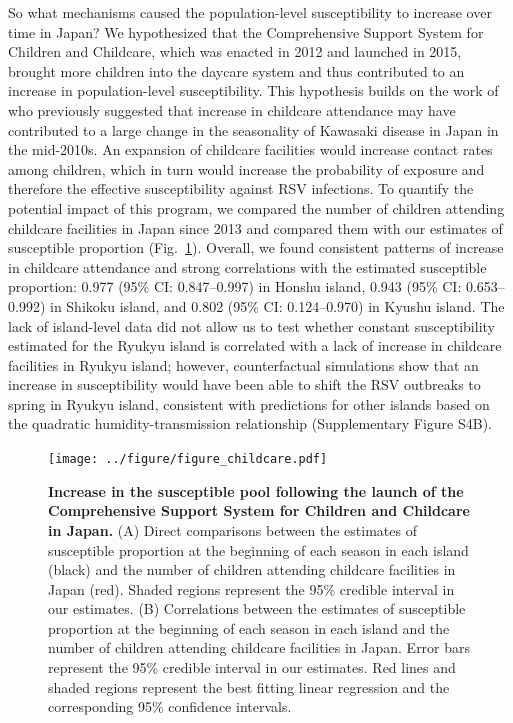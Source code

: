 \documentclass[12pt]{article}
\newcommand{\fref}[1]{Fig.~\ref{fig:#1}}
\begin{document}
So what mechanisms caused the population-level susceptibility to increase over time in Japan?
We hypothesized that the Comprehensive Support System for Children and Childcare, which was enacted in 2012 and launched in 2015, brought more children into the daycare system and thus contributed to an increase in population-level susceptibility.
This hypothesis builds on the work of \cite{dehaan2024age} who previously suggested that increase in childcare attendance may have contributed to a large change in the seasonality of Kawasaki disease in Japan in the mid-2010s.
An expansion of childcare facilities would increase contact rates among children, which in turn would increase the probability of exposure and therefore the effective susceptibility against RSV infections.
To quantify the potential impact of this program, we compared the number of children attending childcare facilities in Japan since 2013 and compared them with our estimates of susceptible proportion (\fref{fig4}).
Overall, we found consistent patterns of increase in childcare attendance and strong correlations with the estimated susceptible proportion: 0.977 (95\% CI: 0.847--0.997) in Honshu island, 0.943 (95\% CI: 0.653--0.992) in Shikoku island, and 0.802 (95\% CI: 0.124--0.970) in Kyushu island.
The lack of island-level data did not allow us to test whether constant susceptibility estimated for the Ryukyu island is correlated with a lack of increase in childcare facilities in Ryukyu island;
however, counterfactual simulations show that an increase in susceptibility would have been able to shift the RSV outbreaks to spring in Ryukyu island, consistent with predictions for other islands based on the quadratic humidity-transmission relationship (Supplementary Figure S4B).

\begin{figure}[!th]
\texttt{[image: ../figure/figure\_childcare.pdf]}
\caption{
\textbf{Increase in the susceptible pool following the launch of the Comprehensive Support System for Children and Childcare in Japan.}
(A) Direct comparisons between the estimates of susceptible proportion at the beginning of each season in each island (black) and the number of children attending childcare facilities in Japan (red).
Shaded regions represent the 95\% credible interval in our estimates.
(B) Correlations between the estimates of susceptible proportion at the beginning of each season in each island and the number of children attending childcare facilities in Japan.
Error bars represent  the 95\% credible interval in our estimates.
Red lines and shaded regions represent the best fitting linear regression and the corresponding 95\% confidence intervals.
}
\label{fig:fig4}
\end{figure}
\end{document}
